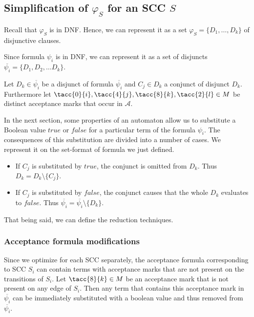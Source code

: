 \documentclass[a4paper,UKenglish,cleveref, autoref, anonymous, thm-restate]{lipics-v2021}
\def\false{\mathit{false}}
\def\true{\mathit{true}}
\begin{document}
\subsection{Simplification of $\varphi_S$ for an SCC $S$}\label{ssec:step1}
Recall that $\varphi_S$ is in DNF. Hence, we can represent it as a set
$\varphi_S=\{D_1,\ldots,D_k\}$ of disjunctive clauses.





Since formula $\psi_{i}$ is in DNF, we can represent it as a set of disjuncts $\overline{\psi_{i}} = \{D_1, D_2, \ldots D_k\}$.

Let $D_{k} \in \overline{\psi_{i}}$ be a disjunct of formula $\overline{\psi_{i}}$ and $C_{j} \in D_{k}$ a conjunct of disjunct $D_{k}$. Furthermore let  $\tacc{0}{i}, \tacc{4}{j}, \tacc{8}{k}, \tacc{2}{l} \in M$ be distinct acceptance marks that occur in $\mathcal{A}$.

In the next section, some properties of an automaton allow us to substitute a Boolean value $\true$ or $\false$ for a particular term of the formula $\psi_i$.
The consequences of this substitution are divided into a number of cases. We represent it on the set-format of formula we just defined.

\begin{itemize}
    \item If $C_{j}$ is substituted by $\true$, the conjunct is omitted from $D_{k}$. Thus $D_{k} = D_{k} \setminus \{C_{j}\}$.
    \item If $C_{j}$ is substituted by $\false$, the conjunct causes that the whole $D_{k}$ evaluates to $\false$. Thus $\overline{\psi_{i}} = \overline{\psi_{i}} \setminus \{D_{k}\}$.

\end{itemize}

That being said, we can define the reduction techniques. 

\subsubsection{Acceptance formula modifications\\} 
\label{subsection:acc_modif}
Since we optimize for each SCC separately, the acceptance formula corresponding to SCC $S_{i}$ can contain terms with acceptance marks that are not present on the transitions of $S_{i}$.
Let $\tacc{8}{k} \in M$ be an acceptance mark that is not present on any edge of $S_{i}$. Then any term that contains this acceptance mark in $\overline{\psi_{i}}$ can be immediately substituted with a boolean value and thus removed from $\overline{\psi_{i}}$.
\medskip
\end{document}
